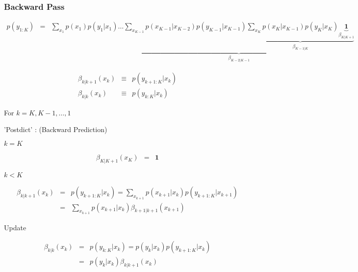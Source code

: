 \documentclass[11pt]{article}
\begin{document}
\subsubsection{Backward Pass}\label{backward-pass}

\begin{eqnarray}
p(y_{1:K}) & = &  \sum_{x_1} p(x_1) p(y_1 | x_1 )
\dots
\underbrace{ \sum_{x_{K-1}} p(x_{K-1}|x_{K-2}) p(y_{K-1} | x_{K-1} )
\underbrace{ \sum_{x_K} p(x_K|x_{K-1}) p(y_K | x_K )
\underbrace{{\pmb 1}}_{\beta_{K|K+1}}}_{\beta_{K-1|K}}}_{\beta_{K-2|K-1}}
\end{eqnarray}

\begin{eqnarray}
\beta_{k|k+1}(x_k) & \equiv & p(y_{k+1:K}| x_k) \\
\beta_{k|k}(x_k) & \equiv & p(y_{k:K}| x_k)
\end{eqnarray}

For \(k=K, K-1, \dots, 1\)

'Postdict' : (Backward Prediction)

\(k=K\)

\begin{eqnarray}
\beta_{K|K+1}(x_K) & = & \mathbf{1} 
\end{eqnarray}

\(k<K\)

\begin{eqnarray}
\beta_{k|k+1}(x_k) & = & p(y_{k+1:K}| x_k) = \sum_{x_{k+1}} p(x_{k+1}| x_{k}) p(y_{k+1:K}| x_{k+1}) \\
& = & \sum_{x_{k+1}} p(x_{k+1}| x_{k}) \beta_{k+1|k+1}(x_{k+1}) 
\end{eqnarray}

Update

\begin{eqnarray}
\beta_{k|k}(x_k)  & = & p(y_{k:K}| x_k) = p(y_k | x_k) p(y_{k+1:K}| x_k) \\
 & = & p(y_k | x_k) {\beta_{k|k+1}(x_k)}
\end{eqnarray}
\end{document}
